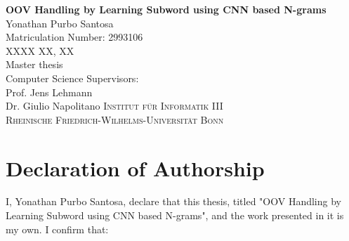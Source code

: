 \documentclass[a4paper,12pt]{report}
\begin{document}




\thispagestyle{empty}
\vskip40mm
\begin{center}
\huge\textbf{OOV Handling by Learning Subword using CNN based N-grams}\\
\vskip 1.5cm
\large Yonathan Purbo Santosa\\
Matriculation Number: 2993106\\
XXXX XX, XX\\
\vskip 1.5cm
Master thesis\\
Computer Science
\vskip 1.5cm
Supervisors:\\
Prof. Jens Lehmann\\
Dr. Giulio Napolitano
\vfill
\textsc{Institut f{\"u}r Informatik III}\\
\textsc{Rheinische Friedrich-Wilhelms-Universit{\"a}t Bonn}
\end{center}

\newpage
\thispagestyle{empty}
\mbox{}

\chapter*{Declaration of Authorship}
I, Yonathan Purbo Santosa, declare that this thesis, titled "OOV Handling by
Learning Subword using CNN based N-grams", and the work presented in
it is my own. I confirm that:
\end{document}
